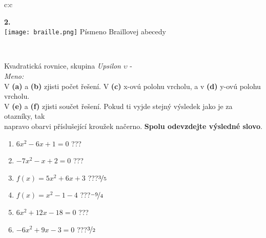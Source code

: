 \documentclass[10pt]{report}
\begin{document}
\begin{tabular}{c:c}
\begin{minipage}[c][99mm][t]{0.49\linewidth}
\begin{center}
\begin{minipage}{0.20\linewidth}
\begin{center}
{\Huge\bfseries 2.} \\[2mm]
\texttt{[image: braille.png]}
{\small Písmeno Braillovej abecedy}
\end{center}
\end{minipage}
\end{center}
\end{minipage}
\\ \hdashline
\begin{minipage}[c][99mm][t]{0.49\linewidth}
\begin{center}
\vspace{7mm}
{\huge Kvadratická rovnice, skupina \textit{Upsilon $\upsilon$} -}\\[4.5mm]
\textit{Meno:}\phantom{xxxxxxxxxxxxxxxxxxxxxxxxxxxxxxxxxxxxxxxxxxxxxxxxxxxxxxxxxxxxxxxxx}\\[3.5mm]
V \textbf{(a)} a \textbf{(b)} zjisti počet řešení. V \textbf{(c)} x-ovú polohu vrcholu, a v \textbf{(d)} y-ovú polohu vrcholu.\\V \textbf{(e)} a \textbf{(f)} zjisti součet řešení. Pokud ti vyjde stejný výsledek jako je za otazníky, tak\\napravo obarvi příslušející kroužek načerno. \textbf{Spolu odevzdejte výsledné slovo}.\\[3mm]
\begin{minipage}{0.77\linewidth}
\begin{center}
\begin{varwidth}{\textwidth}
\begin{enumerate}
\large
\item $6x^2-6x+1=0$\quad \dotfill\; ???\;\dotfill {}
\item $-7x^2-x+2=0$\quad \dotfill\; ???\;\dotfill {}
\item $f(x)=5x^2+6x+3$\quad \dotfill\; ???\;\dotfill \quad $\nicefrac{3}{5}$
\item $f(x)=x^2-1-4$\quad \dotfill\; ???\;\dotfill \quad $\nicefrac{-9}{4}$
\item $6x^2+12x-18=0$\quad \dotfill\; ???\;\dotfill {}
\item $-6x^2+9x-3=0$\quad \dotfill\; ???\;\dotfill \quad $\nicefrac{3}{2}$
\end{enumerate}
\end{varwidth}
\end{center}
\end{minipage}
\begin{minipage}{0.20\linewidth}
\begin{center}

\end{center}
\end{minipage}
\end{center}
\end{minipage}
\end{tabular}
\end{document}
